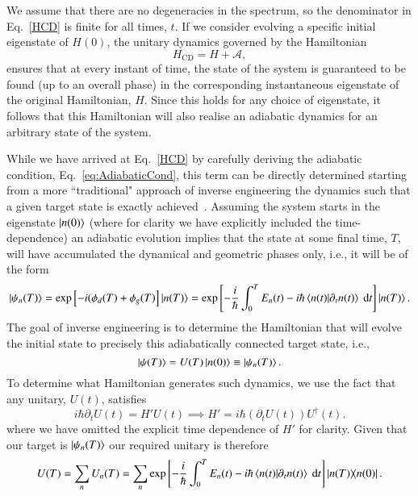 We assume that there are no degeneracies in the spectrum, so the denominator in Eq.~\eqref{HCD} is finite for all times, $t$. If we consider evolving a specific initial eigenstate of $H(0)$, the unitary dynamics governed by the Hamiltonian
\begin{equation}
H_\text{CD} = H + \mathcal{A},
\end{equation}
ensures that at every instant of time, the state of the system is guaranteed to be found (up to an overall phase) in the corresponding instantaneous eigenstate of the original Hamiltonian, $H$. Since this holds for any choice of eigenstate, it follows that this Hamiltonian will also realise an adiabatic dynamics for an arbitrary state of the system. 

While we have arrived at Eq.~\eqref{HCD} by carefully deriving the adiabatic condition, Eq.~\eqref{eq:AdiabaticCond}, this term can be directly determined starting from a more ``traditional" approach of inverse engineering the dynamics such that a given target state is exactly achieved~\cite{Berry2009}. Assuming the system starts in the eigenstate $\ket{n(0)}$ (where for clarity we have explicitly included the time-dependence) an adiabatic evolution implies that the state at some final time, $T$, will have accumulated the dynamical and geometric phases only, i.e., it will be of the form
\begin{equation}
\ket{\psi_n(T)} =  \text{exp}\left[-i(\phi_d(T) + \phi_g(T) \right] \ket{n(T)} = \text{exp}\left[ - \frac{i}{\hbar} \int_0^T E_n(t) - i\hbar \braket{n(t)}{\partial_t n(t)}~\mathrm dt  \right] \ket{n(T)}.
\end{equation}
The goal of inverse engineering is to determine the Hamiltonian that will evolve the initial state to precisely this adiabatically connected target state, i.e.,
\begin{equation}
\ket{\psi(T)} =  U(T) \ket{n(0)} \equiv \ket{\psi_n(T)}.
\end{equation}
To determine what Hamiltonian generates such dynamics, we use the fact that any unitary, $U(t)$, satisfies
\begin{equation}
\label{Uidentity}
i\hbar \partial_t U(t) = H' U(t) \implies H' = i\hbar \left( \partial_t U(t) \right) U^{\dagger}(t).
\end{equation}
where we have omitted the explicit time dependence of $H'$ for clarity. Given that our target is $\ket{\psi_n(T)}$ our required unitary is therefore
\begin{equation}
\label{eq:evo-op}
U(T) = \sum_n U_n(T) = \sum_n  \text{exp}\left[ - \frac{i}{\hbar} \int_0^T E_n(t) - i\hbar \braket{n(t)}{\partial_t n(t)}~\mathrm dt  \right] \ketbra{n(T)}{n(0)}.
\end{equation}
